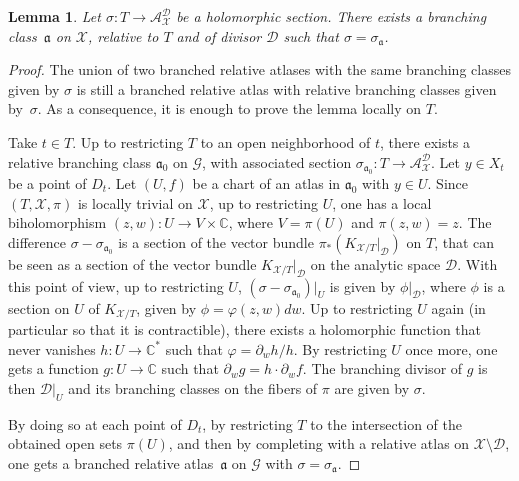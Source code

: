 \documentclass[JEP,XML,SOM,Unicode,NoEqCountersInSection,published]{cedram}
\newcommand{\C}{\mathbb C}
\theoremstyle{definition}
\theoremstyle{plain}
\newtheorem{lemma}[definition]{Lemma}
\begin{document}
\begin{lemma}\label{lemma_branched_atlas_holomorphic_section}
Let $\sigma: T \to \mathcal A_{\mathcal X}^{\mathcal D}$ be a holomorphic section.
There exists a branching class~$\mathfrak a$ on $\mathcal X$, relative to $T$ and of divisor $\mathcal D$ such that $\sigma = \sigma_{\mathfrak a}$.
\end{lemma}

\begin{proof}
The union of two branched relative atlases with the same branching classes given by $\sigma$ is still a branched relative atlas with relative branching classes given by~$\sigma$.
As a consequence, it is enough to prove the lemma locally on $T$.

Take $t \in T$.
Up to restricting $T$ to an open neighborhood of $t$, there exists a relative branching class $\mathfrak a_0$ on $\mathcal G$, with associated section $\sigma_{\mathfrak a_0}: T \to \mathcal A_{\mathcal X}^{\mathcal D}$.
Let $y \in X_t$ be a point of $D_t$.
Let $(U, f)$ be a chart of an atlas in $\mathfrak a_0$ with $y \in U$.
Since $(T, \mathcal X, \pi)$ is locally trivial on $\mathcal X$, up to restricting $U$, one has a local biholomorphism $(z, w): U \to V \times \C$, where $V = \pi(U)$ and $\pi(z, w) = z$.
The difference $\sigma-\sigma_{\mathfrak a_0}$ is a section of the vector bundle $\pi_*(K_{\mathcal X/T}|_{\mathcal D})$ on $T$, that can be seen as a section of the vector bundle $K_{\mathcal X / T}|_{\mathcal D}$ on the analytic space $\mathcal D$.
With this point of view, up to restricting $U$, $(\sigma-\sigma_{\mathfrak a_0})|_U$ is given by $\phi|_{\mathcal D}$, where $\phi$ is a section on $U$ of $K_{\mathcal X/T}$, given by $\phi = \varphi(z, w)dw$.
Up to restricting $U$ again (in particular so that it is contractible), there exists a holomorphic function that never vanishes $h: U \to \mathbb C^*$ such that $\varphi = \partial_w h / h$. By restricting $U$ once more, one gets a function $g: U \to \mathbb C$ such that $\partial_w g = h \cdot \partial_w f$.
The branching divisor of $g$ is then $\mathcal D|_U$ and its branching classes on the fibers of $\pi$ are given by $\sigma$.

By doing so at each point of $D_t$, by restricting $T$ to the intersection of the obtained open sets $\pi(U)$, and then by completing with a relative atlas on $\mathcal X \setminus \mathcal D$, one gets a branched relative atlas~$\mathfrak a$ on $\mathcal G$ with $\sigma = \sigma_{\mathfrak a}$.
\end{proof}
\end{document}
